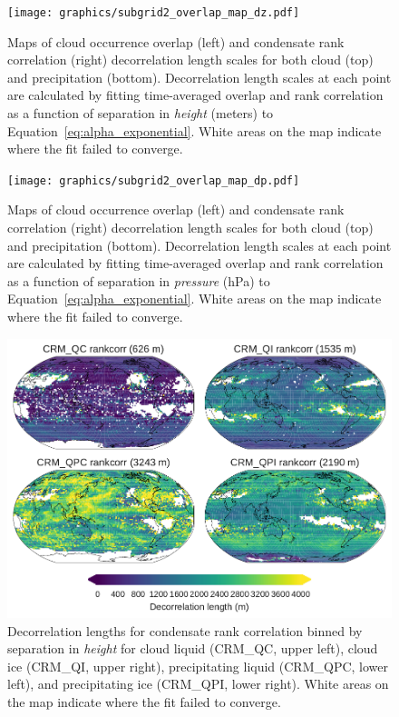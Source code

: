 \begin{figure}[htbp]
\centering
\texttt{[image: graphics/subgrid2\_overlap\_map\_dz.pdf]}
\caption{\label{fig:overlap_map_dz}Maps of cloud occurrence overlap
(left) and condensate rank correlation (right) decorrelation length
scales for both cloud (top) and precipitation (bottom). Decorrelation
length scales at each point are calculated by fitting time-averaged
overlap and rank correlation as a function of separation in
\emph{height} (meters) to Equation~\ref{eq:alpha_exponential}. White
areas on the map indicate where the fit failed to
converge.}\label{fig:overlapux5fmapux5fdz}
\end{figure}

\begin{figure}[htbp]
\centering
\texttt{[image: graphics/subgrid2\_overlap\_map\_dp.pdf]}
\caption{\label{fig:overlap_map_dp}Maps of cloud occurrence overlap
(left) and condensate rank correlation (right) decorrelation length
scales for both cloud (top) and precipitation (bottom). Decorrelation
length scales at each point are calculated by fitting time-averaged
overlap and rank correlation as a function of separation in
\emph{pressure} (hPa) to Equation~\ref{eq:alpha_exponential}. White
areas on the map indicate where the fit failed to
converge.}\label{fig:overlapux5fmapux5fdp}
\end{figure}

\begin{figure}[htbp]
\centering
\includegraphics{graphics/subgrid2_rankcorr_maps.pdf}
\caption{\label{fig:rankcorr_maps_dz}Decorrelation lengths for
condensate rank correlation binned by separation in \emph{height} for
cloud liquid (CRM\_QC, upper left), cloud ice (CRM\_QI, upper right),
precipitating liquid (CRM\_QPC, lower left), and precipitating ice
(CRM\_QPI, lower right). White areas on the map indicate where the fit
failed to converge.}\label{fig:rankcorrux5fmapsux5fdz}
\end{figure}

